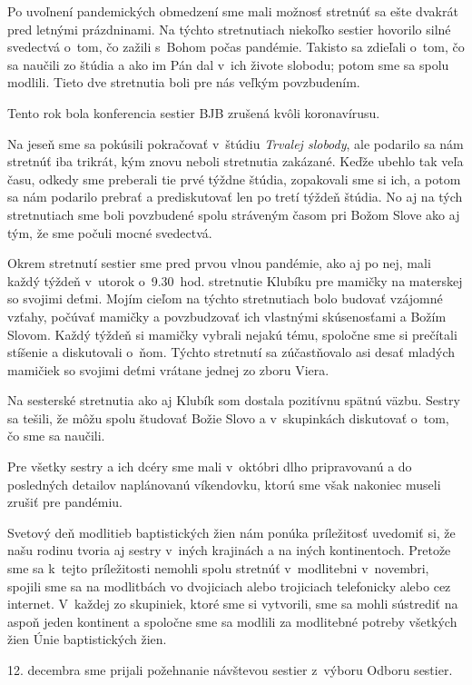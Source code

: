 Po uvoľnení pandemických obmedzení sme mali možnosť stretnúť sa ešte dvakrát pred letnými prázdninami. Na týchto stretnutiach niekoľko sestier hovorilo silné svedectvá o~tom, čo zažili s~Bohom počas pandémie. Takisto sa zdieľali o~tom, čo sa naučili zo štúdia a ako im Pán dal v~ich živote slobodu; potom sme sa spolu modlili. Tieto dve stretnutia boli pre nás veľkým povzbudením.

Tento rok bola konferencia sestier BJB zrušená kvôli koronavírusu.

Na jeseň sme sa pokúsili pokračovať v~štúdiu {\it Trvalej slobody}, ale podarilo sa nám stretnúť iba trikrát, kým znovu neboli stretnutia zakázané. Keďže ubehlo tak veľa času, odkedy sme preberali tie prvé týždne štúdia, zopakovali sme si ich, a potom sa nám podarilo prebrať a prediskutovať len po tretí týždeň štúdia. No aj na tých stretnutiach sme boli povzbudené spolu stráveným časom pri Božom Slove ako aj tým, že sme počuli mocné svedectvá.

Okrem stretnutí sestier sme pred prvou vlnou pandémie, ako aj po nej, mali každý týždeň v~utorok o~9.30~hod. stretnutie Klubíku pre mamičky na materskej so svojimi deťmi. Mojím cieľom na týchto stretnutiach bolo budovať vzájomné vzťahy, počúvať mamičky a povzbudzovať ich vlastnými skúsenosťami a Božím Slovom. Každý týždeň si mamičky vybrali nejakú tému, spoločne sme si prečítali stíšenie a diskutovali o~ňom. Týchto stretnutí sa zúčastňovalo asi desať mladých mamičiek so svojimi deťmi vrátane jednej zo zboru Viera.

Na sesterské stretnutia ako aj Klubík som dostala pozitívnu spätnú väzbu. Sestry sa tešili, že môžu spolu študovať Božie Slovo a v~skupinkách diskutovať o~tom, čo sme sa naučili.

Pre všetky sestry a ich dcéry sme mali v~októbri dlho pripravovanú a do posledných detailov naplánovanú víkendovku, ktorú sme však nakoniec museli zrušiť pre pandémiu.

Svetový deň modlitieb baptistických žien nám ponúka príležitosť uvedomiť si, že našu rodinu tvoria aj sestry v~iných krajinách a na iných kontinentoch. Pretože sme sa k~tejto príležitosti nemohli spolu stretnúť v~modlitebni v~novembri, spojili sme sa na modlitbách vo dvojiciach alebo trojiciach telefonicky alebo cez internet. V~každej zo skupiniek, ktoré sme si vytvorili, sme sa mohli sústrediť na aspoň jeden kontinent a spoločne sme sa modlili za modlitebné potreby všetkých žien Únie baptistických žien.

12. decembra sme prijali požehnanie návštevou sestier z~výboru Odboru sestier.

